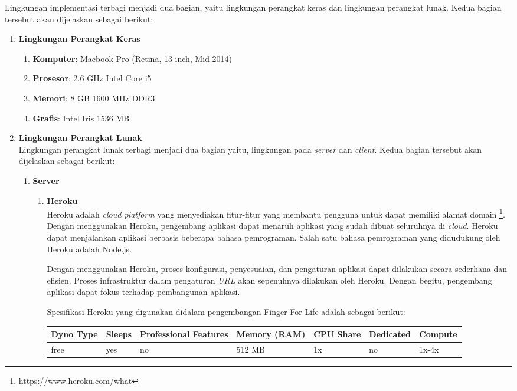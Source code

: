 Lingkungan implementasi terbagi menjadi dua bagian, yaitu lingkungan perangkat keras dan lingkungan perangkat lunak. Kedua bagian tersebut akan dijelaskan sebagai berikut:
\begin{enumerate}
	\item \textbf{Lingkungan Perangkat Keras} \\
	\begin{enumerate}
		\item \textbf{Komputer}: Macbook Pro (Retina, 13 inch, Mid 2014)
		\item \textbf{Prosesor}: 2.6 GHz Intel Core i5
		\item \textbf{Memori}: 8 GB 1600 MHz DDR3
		\item \textbf{Grafis}: Intel Iris 1536 MB
	\end{enumerate}

	\item \textbf{Lingkungan Perangkat Lunak} \\
	Lingkungan perangkat lunak terbagi menjadi dua bagian yaitu, lingkungan pada \textit{server} dan \textit{client}. Kedua bagian tersebut akan dijelaskan sebagai berikut:
	\begin{enumerate}
		\item \textbf{Server} \\
		\begin{enumerate}
			\item \textbf{Heroku} \\
			Heroku adalah \textit{cloud platform} yang menyediakan fitur-fitur yang membantu pengguna untuk dapat memiliki alamat domain \footnote{\url{https://www.heroku.com/what}}. Dengan menggunakan Heroku, pengembang aplikasi dapat menaruh aplikasi yang sudah dibuat seluruhnya di \textit{cloud}. Heroku dapat menjalankan aplikasi berbasis beberapa bahasa pemrograman. Salah satu bahasa pemrograman yang didudukung oleh Heroku adalah Node.js.
			
			Dengan menggunakan Heroku, proses konfigurasi, penyesuaian, dan pengaturan aplikasi dapat dilakukan secara sederhana dan efisien. Proses infrastruktur dalam pengaturan \textit{URL} akan sepenuhnya dilakukan oleh Heroku. Dengan begitu, pengembang aplikasi dapat fokus terhadap pembangunan aplikasi.
			
			Spesifikasi Heroku yang digunakan didalam pengembangan Finger For Life adalah sebagai berikut:
			
			\begin{tabular}{ |p{1.5cm}|p{1.5cm}|p{2cm}|p{1.5cm}|p{1.5cm}|p{1.5cm}|p{1.5cm}|}
			\hline
			Dyno Type & Sleeps & Professional Features & Memory (RAM) & CPU Share & Dedicated & Compute \\ \hline
			free & yes & no & 512 MB & 1x & no & 1x-4x \\ \hline
				

\end{tabular}
\end{enumerate}
\end{enumerate}
\end{enumerate}
